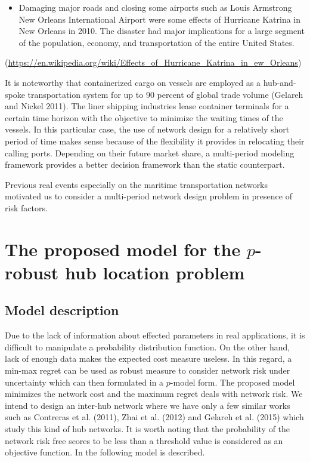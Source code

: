 \documentclass[review]{elsarticle}
\begin{document}
\begin{itemize}
\item
Damaging major roads and closing some airports such as Louis Armstrong New Orleans International Airport were some effects of Hurricane Katrina in New Orleans in 2010. The disaster had major implications for a large segment of the population, economy, and transportation of the entire United States.
\end{itemize}

(\url{https://en.wikipedia.org/wiki/Effects\_of\_Hurricane\_Katrina\_in\_ew\_Orleans})

It is noteworthy that containerized cargo on vessels are employed as a hub-and-spoke transportation system for up to 90 percent of global trade volume (Gelareh and Nickel 2011). The liner shipping industries lease container terminals for a certain time horizon with the objective to minimize the waiting times of the vessels. In this particular case, the use of network design for a relatively short period of time makes sense because of the flexibility it provides in relocating their calling ports. Depending on their future market share, a multi-period modeling framework provides a better decision framework than the static counterpart.

Previous real events especially on the maritime transportation networks motivated us to consider a multi-period network design problem in presence of risk factors.

\section{The proposed model for the $p$-robust hub location problem }\label{se3}
\subsection{Model description}

Due to the lack of information about effected parameters in real applications, it is difficult to manipulate a probability distribution function. On the other hand, lack of enough data makes the expected cost measure useless. In this regard, a min-max regret can be used as robust measure to consider network risk under uncertainty which can then formulated in a $p$-model form. The proposed model minimizes the network cost and the maximum regret deals with network risk. We intend to design an inter-hub network where we have only a few similar works such as Contreras et al. (2011), Zhai et al. (2012) and Gelareh et al. (2015) which study this kind of hub networks. It is worth noting that the probability of the network risk free scores to be less than a threshold value is considered as an objective function. In the following model is described.
\end{document}
